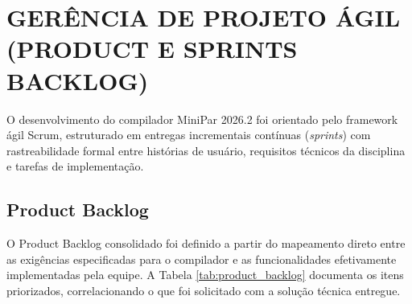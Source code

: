\chapter{GERÊNCIA DE PROJETO ÁGIL (PRODUCT E SPRINTS BACKLOG)}

O desenvolvimento do compilador MiniPar 2026.2 foi orientado pelo framework ágil Scrum, estruturado em entregas incrementais contínuas (\textit{sprints}) com rastreabilidade formal entre histórias de usuário, requisitos técnicos da disciplina e tarefas de implementação.

\section{Product Backlog}

O Product Backlog consolidado foi definido a partir do mapeamento direto entre as exigências especificadas para o compilador e as funcionalidades efetivamente implementadas pela equipe. A Tabela \ref{tab:product_backlog} documenta os itens priorizados, correlacionando o que foi solicitado com a solução técnica entregue.

